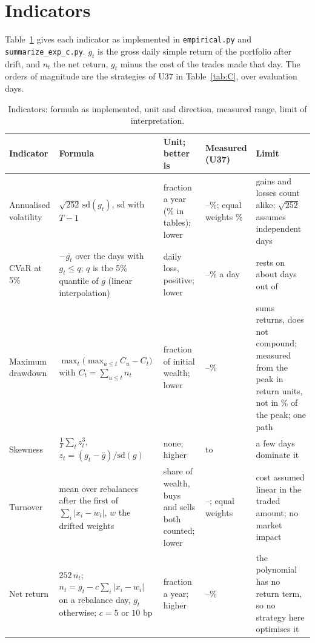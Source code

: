 \documentclass[11pt,a4paper]{article}
\begin{document}
\section{Indicators}\label{app:ind}
Table~\ref{tab:ind} gives each indicator as implemented in \texttt{empirical.py} and \texttt{summarize\_exp\_c.py}.
$g_t$ is the gross daily simple return of the portfolio after drift, and $n_t$ the net return, $g_t$ minus the cost of the trades made that day.
The orders of magnitude are the \mNStrat{} strategies of U37 in Table~\ref{tab:C}, over \uEval{} evaluation days.
\begin{table}[t]
\centering\scriptsize
\caption{Indicators: formula as implemented, unit and direction, measured range, limit of interpretation.}\label{tab:ind}
\begin{tabular}{p{1.8cm}p{4.3cm}p{2.5cm}p{2.1cm}p{3.4cm}}
\toprule
Indicator & Formula & Unit; better is & Measured (U37) & Limit\\
\midrule
Annualised volatility & $\sqrt{252}\,\mathrm{sd}(g_t)$, sd with $T-1$ & fraction a year (\% in tables); lower & \mVolMin{}--\mVolMax{}\%; equal weights \mVolEw{}\% & gains and losses count alike; $\sqrt{252}$ assumes independent days\\
CVaR at 5\% & $-\overline{g_t}$ over the days with $g_t\le q$; $q$ is the 5\% quantile of $g$ (linear interpolation) & daily loss, positive; lower & \mCvarMin{}--\mCvarMax{}\% a day & rests on about \uTail{} days out of \uEval{}\\
Maximum drawdown & $\max_t\big(\max_{u\le t}C_u-C_t\big)$ with $C_t=\sum_{u\le t}n_t$ & fraction of initial wealth; lower & \mDdMin{}--\mDdMax{}\% & sums returns, does not compound; measured from the peak in return units, not in \% of the peak; one path\\
Skewness & $\frac1T\sum_t z_t^3$, $z_t=(g_t-\bar g)/\mathrm{sd}(g)$ & none; higher & \mSkewMin{} to \mSkewMax{} & a few days dominate it\\
Turnover & mean over rebalances after the first of $\sum_i|x_i-w_i|$, $w$ the drifted weights & share of wealth, buys and sells both counted; lower & \mTurnMin{}--\mTurnMax{}; equal weights \mTurnEw{} & cost assumed linear in the traded amount; no market impact\\
Net return & $252\,\overline{n_t}$; $n_t=g_t-c\sum_i|x_i-w_i|$ on a rebalance day, $g_t$ otherwise; $c=5$ or $10$ bp & fraction a year; higher & \mNetMin{}--\mNetMax{}\% & the polynomial has no return term, so no strategy here optimises it\\

\end{tabular}
\end{table}
\end{document}
